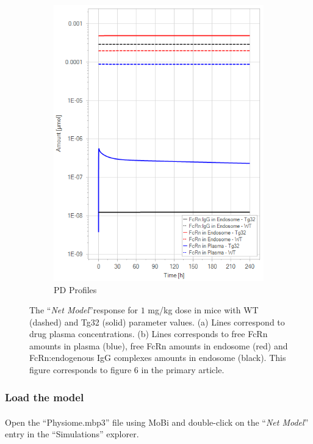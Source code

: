 \documentclass[fleqn,10pt]{physiome}
\begin{document}
\begin{figure}[htb]
\begin{subfigure}{0.49\textwidth}
    \end{subfigure}
    \hfill
    \begin{subfigure}{0.49\textwidth}
        \includegraphics[width=\textwidth]{pl8.png}
        \caption{PD Profiles}
        \label{fig:5b}
    \end{subfigure}
    \caption{The ``\textit{Net Model}''response for $1$ mg/kg dose in mice with WT (dashed) and Tg32 (solid) parameter values. (a) Lines correspond to drug plasma concentrations. (b) Lines corresponds to free FcRn amounts in plasma (blue), free FcRn amounts in endosome (red) and FcRn:endogenous IgG complexes amounts in endosome (black). This figure corresponds to figure 6 in the primary article.}
    \label{fig:5}
\end{figure}

\subsubsection{Load the model}
Open the ``Physiome.mbp3'' file using MoBi\textsuperscript{\textregistered} and double-click on the ``\textit{Net Model}'' entry in the ``Simulations'' explorer.
\end{document}
